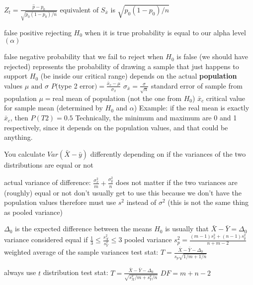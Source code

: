 \documentclass{article}
\begin{document}
\begin{multicols*}{2}
\begin{outline}[compactitem]
  \1 $Z_t=\frac{\hat{p}-p_0}{\sqrt{p_0(1-p_0)/n}}$
  \1 equivalent of $S_\bar{x}$ is $\sqrt{p_0(1-p_0)/n}$

  \1 false positive
  \1 rejecting $H_0$ when it is true
  \1 probability is equal to our alpha level $(\alpha)$

  \1 false negative
  \1 probability that we fail to reject when $H_0$ is false (we should have rejected)
  \1 represents the probability of drawing a sample that just happens to support $H_0$ (be inside our critical range)
  \1 depends on the actual \textbf{population} values $\mu\mbox{ and }\sigma$
  \1 $P($type 2 error$)=\frac{\bar{x}_c-\mu}{\sigma_{\bar{x}}}$
    \2 $\sigma_{\bar{x}}=\frac{\sigma}{\sqrt{n}}$ standard error of sample from population
    \2 $\mu=$real mean of population (not the one from $H_0$)
    \2 $\bar{x}_c$ critical value for sample mean (determined by $H_0$ and $\alpha$)
  \1 Example: if the real mean is exactly $\bar{x}_c$, then $P(T2)=0.5$
  \1 Technically, the minimum and maximum are 0 and 1 respectively, since it depends on the population values, and that could be anything.


\noindent
You calculate $Var(\bar{X}-\bar{y})$ differently depending on if the variances of the two distributions are equal or not

  \1 actual variance of difference: $\frac{\sigma^2_x}{m} + \frac{\sigma^2_y}{n}$
    \2 does not matter if the two variances are (roughly) equal or not
    \2 don't usually get to use this because we don't have the population values
    \2 therefore must use $s^2$ instead of $\sigma^2$
    \2 (this is not the same thing as pooled variance)

  \1 $\Delta_0$ is the expected difference between the means
  \1 $H_0$ is usually that $\bar{X} - \bar{Y} = \Delta_0$
  \1 variance considered equal if $\frac{1}{3}\leq \frac{s_X^2}{s_Y^2} \leq 3$
  \1 pooled variance $s_p^2 = \frac{(m-1)s_x^2 + (n-1)s_y^2}{n+m-2}$
    \2 weighted average of the sample variances
  \1 test stat: $T = \frac{\bar{X}-\bar{Y}-\Delta_0}{s_p\sqrt{1/m+1/n}}$

  \1 always use $t$ distribution
  \1 test stat: $T = \frac{\bar{X}-\bar{Y}-\Delta_0}{\sqrt{s_X^2/m+s_Y^2/n}}$
  \1 $DF = m+n-2$


\end{outline}
\end{multicols*}
\end{document}
